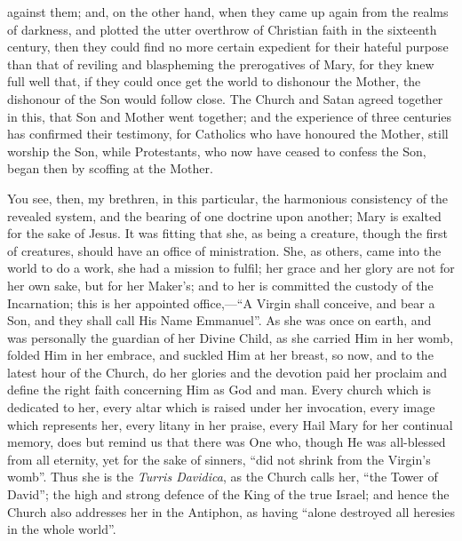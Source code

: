 against them; and, on the other hand, when they came up again from the
realms of darkness, and plotted the utter overthrow of Christian faith
in the sixteenth century, then they could find no more certain
expedient for their hateful purpose than that of reviling and
blaspheming the prerogatives of Mary, for they knew full well that, if
they could once get the world to dishonour the Mother, the dishonour
of the Son would follow close. The Church and Satan agreed together in
this, that Son and Mother went together; and the experience of three
centuries has confirmed their testimony, for Catholics who have
honoured the Mother, still worship the Son, while Protestants, who now
have ceased to confess the Son, began then by scoffing at the Mother.

You see, then, my brethren, in this particular, the harmonious
consistency of the revealed system, and the bearing of one doctrine
upon another; Mary is exalted for the sake of Jesus. It was fitting
that she, as being a creature, though the first of creatures, should
have an office of ministration. She, as others, came into the world to
do a work, she had a mission to fulfil; her grace and her glory are
not for her own sake, but for her Maker's; and to her is committed the
custody of the Incarnation; this is her appointed office,—``A
Virgin shall conceive, and bear a Son, and they shall call His Name
Emmanuel''. As she was once on earth, and was personally the
guardian of her Divine Child, as she carried Him in her womb, folded
Him in her embrace, and suckled Him at her breast, so now, and to the
latest hour of the Church, do her glories and the devotion paid her
proclaim and define the right faith concerning Him as God and man.
Every church which is dedicated to her, every altar which is raised
under her invocation, every image which represents her, every litany
in her praise, every Hail Mary for her continual memory, does but
remind us that there was One who, though He was all-blessed from all
eternity, yet for the sake of sinners, ``did not shrink from the
Virgin's womb''. Thus she is the \emph{Turris Davidica}, as the
Church calls her, ``the Tower of David''; the high and strong
defence of the King of the true Israel; and hence the Church also
addresses her in the Antiphon, as having ``alone destroyed all
heresies in the whole world''.

